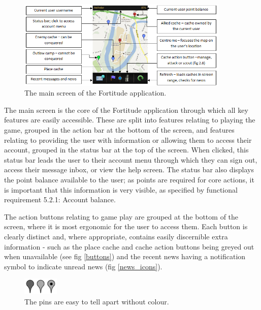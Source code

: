 \begin{figure}[ht]
	\begin{center}
	\includegraphics[width=0.9\textwidth]{images/main_screen}
	\caption{The main screen of the Fortitude application.}
	\label{main_screen}
	\end{center}
\end{figure}

The main screen is the core of the Fortitude application through which all key features are easily accessible. These are split into features relating to playing the game, grouped in the action bar at the bottom of the screen, and features relating to providing the user with information or allowing them to access their account, grouped in the status bar at the top of the screen. When clicked, this status bar leads the user to their account menu through which they can sign out, access their message inbox, or view the help screen. The status bar also displays the point balance available to the user; as points are required for core actions, it is important that this information is very visible, as specified by functional requirement 5.2.1: Account balance.

The action buttons relating to game play are grouped at the bottom of the screen, where it is most ergonomic for the user to access them. Each button is clearly distinct and, where appropriate, contains easily discernible extra information - such as the place cache and cache action buttons being greyed out when unavailable (see fig \ref{buttons}) and the recent news having a notification symbol to indicate unread news (fig \ref{news_icons}). 

\begin{figure}
	\vspace{-20pt}
	\begin{center}
	\includegraphics[width=0.15\textwidth]{images/grey_pins}
	\caption{The pins are easy to tell apart without colour.}
	\label{grey_pins}
	\end{center}
	\vspace{-20pt}
\end{figure}

